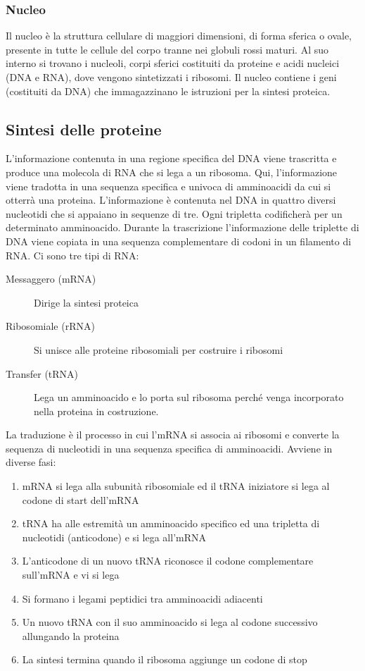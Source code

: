 \documentclass[a4paper]{article}
\begin{document}
\subsubsection{Nucleo}
Il nucleo è la struttura cellulare di maggiori dimensioni, di forma sferica o 
ovale, presente in tutte le cellule del corpo tranne nei globuli rossi maturi.
Al suo interno si trovano i nucleoli, corpi sferici costituiti da proteine e 
acidi nucleici (DNA e RNA), dove vengono sintetizzati i ribosomi. Il nucleo 
contiene i geni (costituiti da DNA) che immagazzinano le istruzioni per la 
sintesi proteica.
\subsection{Sintesi delle proteine}
L’informazione contenuta in una regione specifica del DNA viene trascritta e 
produce una molecola di RNA che si lega a un ribosoma. Qui, l’informazione 
viene tradotta in una sequenza specifica e univoca di amminoacidi da cui si 
otterrà una proteina. L’informazione è contenuta nel DNA in quattro diversi 
nucleotidi che si appaiano in sequenze di tre. Ogni tripletta codificherà 
per un determinato amminoacido. Durante la trascrizione l’informazione delle 
triplette di DNA viene copiata in una sequenza complementare di codoni in un
filamento di RNA. Ci sono tre tipi di RNA:
\begin{description}
\item[Messaggero (mRNA)] Dirige la sintesi proteica
\item[Ribosomiale (rRNA)] Si unisce alle proteine ribosomiali per costruire i 
ribosomi
\item[Transfer (tRNA)] Lega un amminoacido e lo porta sul ribosoma perché 
venga incorporato nella proteina in costruzione.
\end{description}
La traduzione è il processo in cui l'mRNA si associa ai ribosomi e converte
la sequenza di nucleotidi in una sequenza specifica di amminoacidi.
Avviene in diverse fasi:
\begin{enumerate}
    \item mRNA si lega alla subunità ribosomiale ed il tRNA iniziatore si lega
    al codone di start dell'mRNA
    \item tRNA ha alle estremità un amminoacido specifico ed una tripletta di 
    nucleotidi (anticodone) e si lega all'mRNA
    \item L'anticodone di un nuovo tRNA riconosce il codone complementare 
    sull'mRNA e vi si lega
    \item Si formano i legami peptidici tra amminoacidi adiacenti
    \item Un nuovo tRNA con il suo amminoacido si lega al codone successivo
    allungando la proteina
    \item La sintesi termina quando il ribosoma aggiunge un codone di stop
\end{enumerate}
\end{document}
